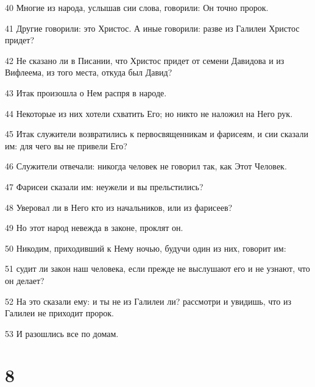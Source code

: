 \par 40 Многие из народа, услышав сии слова, говорили: Он точно пророк.
\par 41 Другие говорили: это Христос. А иные говорили: разве из Галилеи Христос придет?
\par 42 Не сказано ли в Писании, что Христос придет от семени Давидова и из Вифлеема, из того места, откуда был Давид?
\par 43 Итак произошла о Нем распря в народе.
\par 44 Некоторые из них хотели схватить Его; но никто не наложил на Него рук.
\par 45 Итак служители возвратились к первосвященникам и фарисеям, и сии сказали им: для чего вы не привели Его?
\par 46 Служители отвечали: никогда человек не говорил так, как Этот Человек.
\par 47 Фарисеи сказали им: неужели и вы прельстились?
\par 48 Уверовал ли в Него кто из начальников, или из фарисеев?
\par 49 Но этот народ невежда в законе, проклят он.
\par 50 Никодим, приходивший к Нему ночью, будучи один из них, говорит им:
\par 51 судит ли закон наш человека, если прежде не выслушают его и не узнают, что он делает?
\par 52 На это сказали ему: и ты не из Галилеи ли? рассмотри и увидишь, что из Галилеи не приходит пророк.
\par 53 И разошлись все по домам.

\chapter{8}

